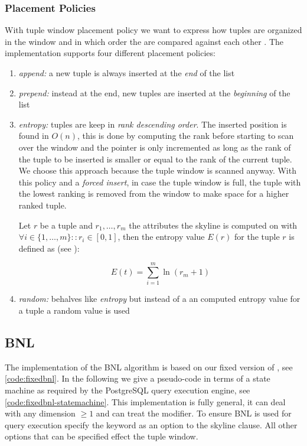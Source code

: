 \subsubsection{Placement Policies}
\label{sec:tuplewindowpolicies}
With tuple window placement policy we want to express how tuples are
organized in the window and in which order the are compared against
each other \citep{Godfrey2007}. The implementation supports four
different placement policies:
\begin{enumerate}
\item \emph{append:} 
a new tuple is always inserted at the \emph{end} of the list

\item \emph{prepend:}
instead at the end, new tuples are inserted at the \emph{beginning} of
the list

\item \emph{entropy:}
tuples are keep in \emph{rank descending order}. The inserted position
is found in $O(n)$, this is done by computing the rank before starting
to scan over the window and the pointer is only incremented as long as
the rank of the tuple to be inserted is smaller or equal to the rank
of the current tuple. We choose this approach because the tuple window
is scanned anyway. With this policy and a \emph{forced insert}, in
case the tuple window is full, the tuple with the lowest ranking is
removed from the window to make space for a higher ranked tuple.

Let $r$ be a tuple and $r_1, \ldots, r_m$ the attributes the skyline
is computed on with $\forall i \in \{1, \ldots, m\}\colon: r_i \in [0,
1]$, then the entropy value $E(r)$ for the tuple $r$ is defined as
(see \citep{Chomicki2003,Chomicki2005}):

\begin{equation}\label{eqn:entropy}
E(t) = \sum_{i=1}^{m} \ln(r_m + 1)
\end{equation}

\item \emph{random: }
behalves like \emph{entropy} but instead of a an computed entropy value
for a tuple a random value is used

\end{enumerate}

\subsection{BNL}
The implementation of the BNL algorithm is based on our fixed version
of \citep{Borzsonyi2001}, see \autoref{code:fixedbnl}. In the
following we give a pseudo-code in terms of a state machine as
required by the PostgreSQL query execution engine, see
\autoref{code:fixedbnl-statemachine}. This implementation is fully general, it can deal with any dimension $\ge 1$ and can treat the  modifier. To ensure BNL is used for query execution specify the 
keyword as an option to the skyline clause.  All other options that
can be specified effect the tuple window.


